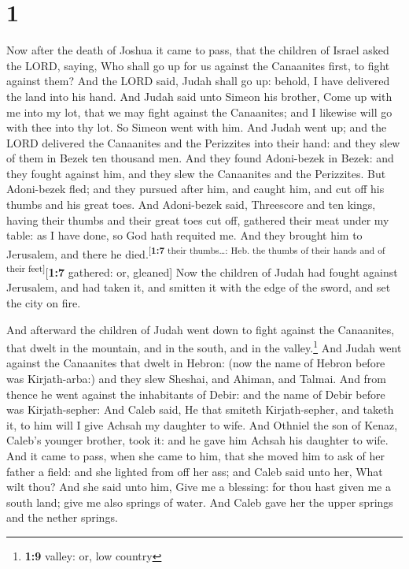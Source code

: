 \hypertarget{section}{%
\section{1}\label{section}}

 Now after the death of Joshua it came to pass, that the
children of Israel asked the LORD, saying, Who shall go up for us
against the Canaanites first, to fight against them?  And
the LORD said, Judah shall go up: behold, I have delivered the land into
his hand.  And Judah said unto Simeon his brother, Come up
with me into my lot, that we may fight against the Canaanites; and I
likewise will go with thee into thy lot. So Simeon went with him.
 And Judah went up; and the LORD delivered the Canaanites
and the Perizzites into their hand: and they slew of them in Bezek ten
thousand men.  And they found Adoni-bezek in Bezek: and
they fought against him, and they slew the Canaanites and the
Perizzites.  But Adoni-bezek fled; and they pursued after
him, and caught him, and cut off his thumbs and his great toes.
 And Adoni-bezek said, Threescore and ten kings, having
their thumbs and their great toes cut off, gathered their meat under my
table: as I have done, so God hath requited me. And they brought him to
Jerusalem, and there he died.\textsuperscript{{[}\textbf{1:7} their
thumbs\ldots: Heb. the thumbs of their hands and of their
feet{]}}{[}\textbf{1:7} gathered: or, gleaned{]}  Now the
children of Judah had fought against Jerusalem, and had taken it, and
smitten it with the edge of the sword, and set the city on fire.

 And afterward the children of Judah went down to fight
against the Canaanites, that dwelt in the mountain, and in the south,
and in the valley.\footnote{\textbf{1:9} valley: or, low country}
 And Judah went against the Canaanites that dwelt in
Hebron: (now the name of Hebron before was Kirjath-arba:) and they slew
Sheshai, and Ahiman, and Talmai.  And from thence he went
against the inhabitants of Debir: and the name of Debir before was
Kirjath-sepher:  And Caleb said, He that smiteth
Kirjath-sepher, and taketh it, to him will I give Achsah my daughter to
wife.  And Othniel the son of Kenaz, Caleb's younger
brother, took it: and he gave him Achsah his daughter to wife.
 And it came to pass, when she came to him, that she
moved him to ask of her father a field: and she lighted from off her
ass; and Caleb said unto her, What wilt thou?  And she
said unto him, Give me a blessing: for thou hast given me a south land;
give me also springs of water. And Caleb gave her the upper springs and
the nether springs.

